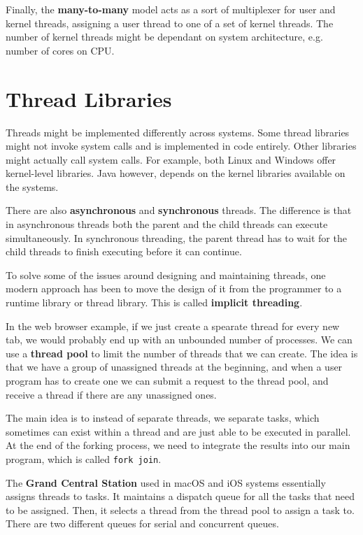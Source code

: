 \documentclass{tufte-handout}
\begin{document}
Finally, the \textbf{many-to-many} model acts as a sort of multiplexer for user and kernel 
threads, assigning a user thread to one of a set of kernel threads. The number of kernel
threads might be dependant on system architecture, e.g. number of cores on CPU.

\section{Thread Libraries}
Threads might be implemented differently across systems. Some thread libraries might not 
invoke system calls and is implemented in code entirely. Other libraries might 
actually call system calls. For example, both Linux and Windows offer kernel-level libraries.
Java however, depends on the kernel libraries available on the systems.

There are also \textbf{asynchronous} and \textbf{synchronous} threads. The difference
is that in asynchronous threads both the parent and the child threads can execute 
simultaneously. In synchronous threading, the parent thread has to wait for the child
threads to finish executing before it can continue.

To solve some of the issues around designing and maintaining threads, one modern approach
has been to move the design of it from the programmer to a runtime library or thread 
library. This is called \textbf{implicit threading}.

In the web browser example, if we just create a spearate thread for every new tab, we would
probably end up with an unbounded number of processes. We can use a \textbf{thread pool} to 
limit the number of threads that we can create. The idea is that we have a group of 
unassigned threads at the beginning, and when a user program has to create one we can submit a
request to the thread pool, and receive a thread if there are any unassigned ones.

The main idea is to instead of separate threads, we separate tasks, which sometimes can exist
within a thread and are just able to be executed in parallel.
At the end of the forking process, we need to integrate the results into our main program,
which is called \texttt{fork join}.

The \textbf{Grand Central Station} used in macOS and iOS systems essentially assigns threads
to tasks. It maintains a dispatch queue for all the tasks that need to be assigned. Then,
it selects a thread from the thread pool to assign a task to. There are two different 
queues for serial and concurrent queues.
\end{document}
